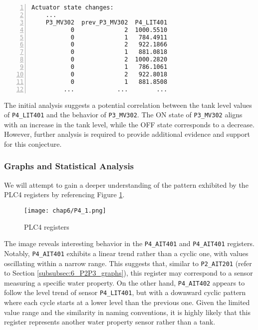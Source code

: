 \begin{lstlisting}[language=bash, numbers=left, caption=\texttt{P3\_MV302} state changes in relation to \texttt{P4\_LIT401}, label=lst:6_P3P4_preproc_changestate]
	Actuator state changes:
	...
	P3_MV302  prev_P3_MV302  P4_LIT401
	       0              2  1000.5510
	       0              1   784.4911
	       0              2   922.1866
	       0              1   881.0818
	       0              2  1000.2820
	       0              1   786.1061
	       0              2   922.8018
	       0              1   881.8508
	     ...            ...        ...
\end{lstlisting}

The initial analysis suggests a potential correlation between the tank level values of \texttt{P4\_LIT401} and the behavior of \texttt{P3\_MV302}. The ON state of \texttt{P3\_MV302} aligns with an increase in the tank level, while the OFF state corresponds to a decrease. However, further analysis is required to provide additional evidence and support for this conjecture.
\vfill

\subsubsection{Graphs and Statistical Analysis}
\label{subsubsec:6_P3P4_graphs}
We will attempt to gain a deeper understanding of the pattern exhibited by the PLC4 registers by referencing Figure \ref{fig:6_graph_P4}.

\begin{figure}[ht]
	\centering
	\texttt{[image: chap6/P4\_1.png]}
	\caption{PLC4 registers}
	\label{fig:6_graph_P4}
\end{figure}

The image reveals interesting behavior in the \texttt{P4\_AIT401} and \texttt{P4\_AIT401} registers. Notably, \texttt{P4\_AIT401} exhibits a linear trend rather than a cyclic one, with values oscillating within a narrow range. This suggests that, similar to \texttt{P2\_AIT201} (refer to Section \ref{subsubsec:6_P2P3_graphs}), this register may correspond to a sensor measuring a specific water property. On the other hand, \texttt{P4\_AIT402} appears to follow the level trend of sensor \texttt{P4\_LIT401}, but with a downward cyclic pattern where each cycle starts at a lower level than the previous one. Given the limited value range and the similarity in naming conventions, it is highly likely that this register represents another water property sensor rather than a tank.

